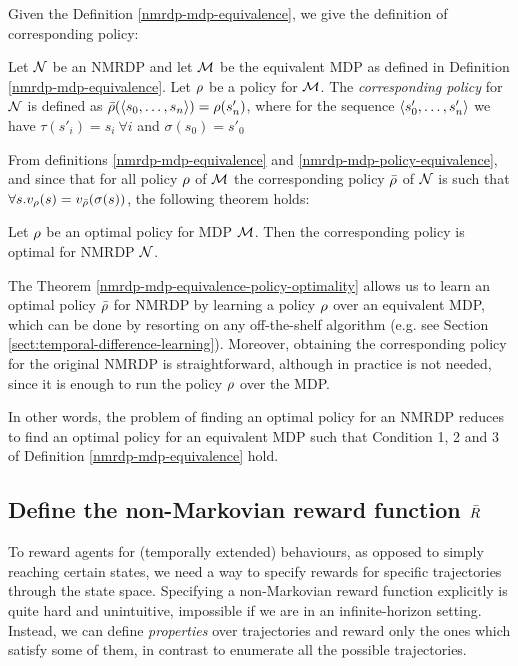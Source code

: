 Given the Definition \ref{nmrdp-mdp-equivalence}, we give the definition of corresponding policy:
\begin{definition}\label{nmrdp-mdp-policy-equivalence}
	Let $\mathcal{N}$ be an NMRDP and let $\mathcal{M}$ be the equivalent MDP as defined in Definition \ref{nmrdp-mdp-equivalence}.
	Let $\rho$ be  a  policy  for $\mathcal{M}$. The 
	\emph{corresponding policy} for $\mathcal{N}$ is  defined  as 
	$\bar{\rho}(\langle s_0, \dots, s_n \rangle) = \rho(s'_n) $,   where for the sequence $\langle s'_0, \dots, s'_n \rangle$ we have $\tau(s'_i) = s_i\ \forall i$ and $\sigma(s_0)=s'_0$
\end{definition}
From definitions \ref{nmrdp-mdp-equivalence} and 
\ref{nmrdp-mdp-policy-equivalence}, and since that for all 
policy $\rho$ of $\mathcal{M}$ the corresponding policy 
$\bar{\rho}$ of $\mathcal{N}$ is such that $ \forall s. v_\rho(s) = v_{\bar{\rho}}(\sigma(s))$, the following theorem holds:
\begin{theorem}\label{nmrdp-mdp-equivalence-policy-optimality}
	Let $\rho$ be an optimal policy for MDP $\mathcal{M}$. Then the corresponding policy is optimal for NMRDP $\mathcal{N}$.
\end{theorem}

The Theorem \ref{nmrdp-mdp-equivalence-policy-optimality} allows us to learn an optimal policy $\bar{\rho}$ for NMRDP by learning a policy $\rho$ over an equivalent MDP, which can be done by resorting on any off-the-shelf algorithm (e.g. see Section \ref{sect:temporal-difference-learning}). Moreover, obtaining the corresponding policy for the original NMRDP is straightforward, although in practice is not needed, since it is enough to run the policy $\rho$ over the MDP.

In other words, the problem of finding an optimal policy for an NMRDP reduces to find an optimal policy for an equivalent MDP such that Condition 1, 2 and 3 of Definition \ref{nmrdp-mdp-equivalence} hold.


\subsection{Define the non-Markovian reward function $\bar{R}$}
To  reward  agents  for  (temporally  extended)
behaviours, as opposed to simply reaching certain states, we need a way
to specify rewards for specific trajectories through the state
space. 
Specifying a non-Markovian reward function explicitly is quite hard and unintuitive, impossible if we are in an infinite-horizon setting. 
Instead, we can define \emph{properties} over trajectories and reward only the ones which satisfy some of them, in contrast to enumerate all the possible trajectories.

